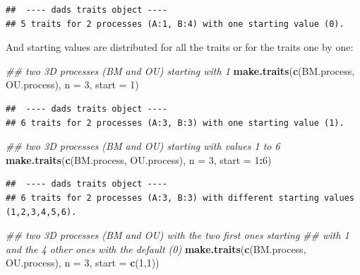 \documentclass[]{book}
\newenvironment{Shaded}{\begin{snugshade}}{\end{snugshade}}
\newcommand{\CommentTok}[1]{\textcolor[rgb]{0.56,0.35,0.01}{\textit{#1}}}
\newcommand{\DataTypeTok}[1]{\textcolor[rgb]{0.13,0.29,0.53}{#1}}
\newcommand{\DecValTok}[1]{\textcolor[rgb]{0.00,0.00,0.81}{#1}}
\newcommand{\KeywordTok}[1]{\textcolor[rgb]{0.13,0.29,0.53}{\textbf{#1}}}
\newcommand{\NormalTok}[1]{#1}
\newcommand{\OperatorTok}[1]{\textcolor[rgb]{0.81,0.36,0.00}{\textbf{#1}}}
\begin{document}
\begin{verbatim}
##  ---- dads traits object ---- 
## 5 traits for 2 processes (A:1, B:4) with one starting value (0).
\end{verbatim}

And starting values are distributed for all the traits or for the traits one by one:

\begin{Shaded}
\begin{Highlighting}[]
\CommentTok{## two 3D processes (BM and OU) starting with 1}
\KeywordTok{make.traits}\NormalTok{(}\KeywordTok{c}\NormalTok{(BM.process, OU.process), }\DataTypeTok{n =} \DecValTok{3}\NormalTok{, }\DataTypeTok{start =} \DecValTok{1}\NormalTok{)}
\end{Highlighting}
\end{Shaded}

\begin{verbatim}
##  ---- dads traits object ---- 
## 6 traits for 2 processes (A:3, B:3) with one starting value (1).
\end{verbatim}

\begin{Shaded}
\begin{Highlighting}[]
\CommentTok{## two 3D processes (BM and OU) starting with values 1 to 6}
\KeywordTok{make.traits}\NormalTok{(}\KeywordTok{c}\NormalTok{(BM.process, OU.process), }\DataTypeTok{n =} \DecValTok{3}\NormalTok{, }\DataTypeTok{start =} \DecValTok{1}\OperatorTok{:}\DecValTok{6}\NormalTok{)}
\end{Highlighting}
\end{Shaded}

\begin{verbatim}
##  ---- dads traits object ---- 
## 6 traits for 2 processes (A:3, B:3) with different starting values (1,2,3,4,5,6).
\end{verbatim}

\begin{Shaded}
\begin{Highlighting}[]
\CommentTok{## two 3D processes (BM and OU) with the two first ones starting}
\CommentTok{## with 1 and the 4 other ones with the default (0)}
\KeywordTok{make.traits}\NormalTok{(}\KeywordTok{c}\NormalTok{(BM.process, OU.process), }\DataTypeTok{n =} \DecValTok{3}\NormalTok{, }\DataTypeTok{start =} \KeywordTok{c}\NormalTok{(}\DecValTok{1}\NormalTok{,}\DecValTok{1}\NormalTok{))}
\end{Highlighting}
\end{Shaded}
\end{document}
